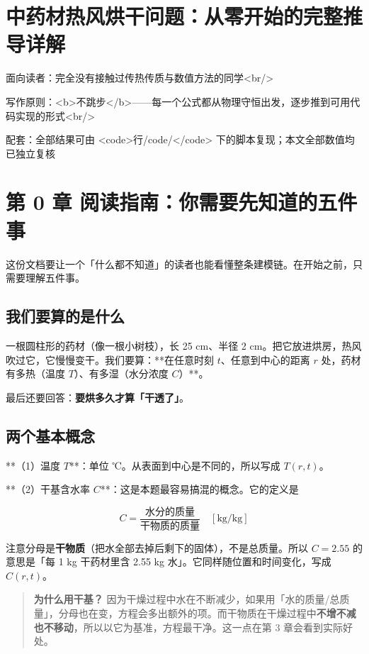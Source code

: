 
\section{中药材热风烘干问题：从零开始的完整推导详解}



面向读者：完全没有接触过传热传质与数值方法的同学<br/>

写作原则：<b>不跳步</b>——每一个公式都从物理守恒出发，逐步推到可用代码实现的形式<br/>

配套：全部结果可由 <code>行/code/</code> 下的脚本复现；本文全部数值均已独立复核



\section{第 0 章 阅读指南：你需要先知道的五件事}


这份文档要让一个「什么都不知道」的读者也能看懂整条建模链。在开始之前，只需要理解五件事。


\subsection{我们要算的是什么}


一根圆柱形的药材（像一根小树枝），长 25 cm、半径 2 cm。把它放进烘房，热风吹过它，它慢慢变干。我们要算：**在任意时刻 $t$、任意到中心的距离 $r$ 处，药材有多热（温度 $T$）、有多湿（水分浓度 $C$）**。


最后还要回答：\textbf{要烘多久才算「干透了」}。


\subsection{两个基本概念}


**（1）温度 $T$**：单位 ℃。从表面到中心是不同的，所以写成 $T(r,t)$。


**（2）干基含水率 $C$**：这是本题最容易搞混的概念。它的定义是


\begin{equation*}
C=\frac{\text{水分的质量}}{\text{干物质的质量}}\quad[\mathrm{kg/kg}]
\end{equation*}


注意分母是\textbf{干物质}（把水全部去掉后剩下的固体），不是总质量。所以 $C=2.55$ 的意思是「每 1 kg 干药材里含 2.55 kg 水」。它同样随位置和时间变化，写成 $C(r,t)$。


\begin{quote}
\textbf{为什么用干基？} 因为干燥过程中水在不断减少，如果用「水的质量/总质量」，分母也在变，方程会多出额外的项。而干物质在干燥过程中\textbf{不增不减也不移动}，所以以它为基准，方程最干净。这一点在第 3 章会看到实际好处。
\end{quote}


